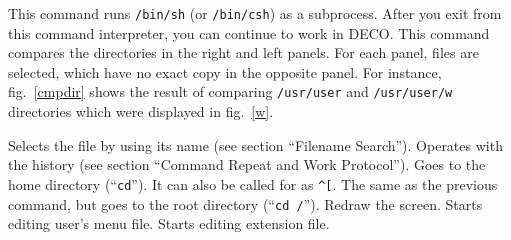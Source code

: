 \begin{example}
This command runs {\tt /bin/sh} (or {\tt /bin/csh}) as a subprocess.
After you exit from this command interpreter, you can
continue to work in DECO.
This command compares the directories in the right and left panels. For each
panel, files are selected, which have no exact copy in the opposite panel. For
instance, fig.~\ref{cmpdir} shows the result of comparing {\tt /usr/user}
and {\tt /usr/user/w} directories which were displayed in fig.~\ref{w}.


Selects the file by using its name (see section ``Filename Search'').
Operates with the history (see section ``Command Repeat and Work Protocol'').
\litem{Home directory~--- {\tt \^{}{[}}}
Goes to the home directory (``{\tt cd}''). It can also be called for as
{\tt \^{}{[}}.
The same as the previous command, but goes to the root directory
(``{\tt cd /}'').
\litem{Redraw screen~--- {\tt \^{}{]}}}
Redraw the screen.
Starts editing user's menu file.
Starts editing extension file.
\end{example}


